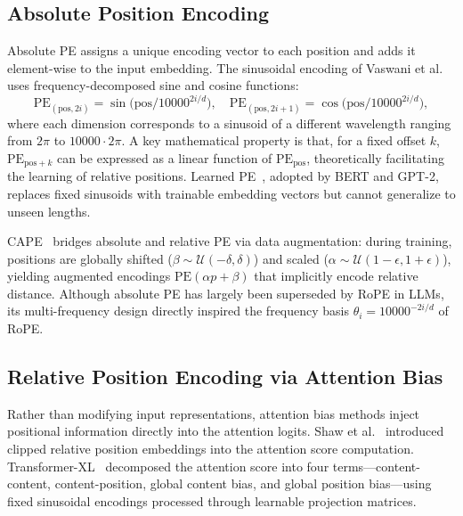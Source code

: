 \subsection{Absolute Position Encoding}
\label{subsec:ape}

Absolute PE assigns a unique encoding vector to each position and adds it element-wise to the input embedding. The sinusoidal encoding of Vaswani et al.~\cite{vaswani2017attention} uses frequency-decomposed sine and cosine functions:
\begin{equation}
  \mathrm{PE}_{(\mathrm{pos},2i)} = \sin\!\bigl(\mathrm{pos}/10000^{2i/d}\bigr), \quad
  \mathrm{PE}_{(\mathrm{pos},2i+1)} = \cos\!\bigl(\mathrm{pos}/10000^{2i/d}\bigr),
  \label{eq:sinusoidal_pe}
\end{equation}
where each dimension corresponds to a sinusoid of a different wavelength ranging from $2\pi$ to $10000 \cdot 2\pi$. A key mathematical property is that, for a fixed offset $k$, $\mathrm{PE}_{\mathrm{pos}+k}$ can be expressed as a linear function of $\mathrm{PE}_{\mathrm{pos}}$, theoretically facilitating the learning of relative positions. Learned PE~\cite{gehring2017convolutional}, adopted by BERT and GPT-2, replaces fixed sinusoids with trainable embedding vectors but cannot generalize to unseen lengths.

CAPE~\cite{likhomanenko2021cape} bridges absolute and relative PE via data augmentation: during training, positions are globally shifted ($\beta \sim \mathcal{U}(-\delta,\delta)$) and scaled ($\alpha \sim \mathcal{U}(1-\epsilon,1+\epsilon)$), yielding augmented encodings $\mathrm{PE}(\alpha p + \beta)$ that implicitly encode relative distance. Although absolute PE has largely been superseded by RoPE in LLMs, its multi-frequency design directly inspired the frequency basis $\theta_i = 10000^{-2i/d}$ of RoPE.

\subsection{Relative Position Encoding via Attention Bias}
\label{subsec:attention_bias}

Rather than modifying input representations, attention bias methods inject positional information directly into the attention logits. Shaw et al.~\cite{shaw2018self} introduced clipped relative position embeddings into the attention score computation. Transformer-XL~\cite{dai2019transformerxl} decomposed the attention score into four terms---content-content, content-position, global content bias, and global position bias---using fixed sinusoidal encodings processed through learnable projection matrices.

